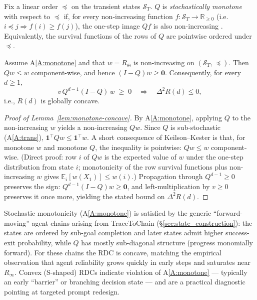 \begin{assumption}\label{A:monotone}
Fix a linear order $\preceq$ on the transient states $\mathcal{S}_T$.
$Q$ is \emph{stochastically monotone} with respect to $\preceq$ if, for
every non-increasing function $f:\mathcal{S}_T\to\mathbb{R}_{\ge 0}$
(i.e.\ $i\preceq j\Rightarrow f(i)\ge f(j)$), the one-step image
$Qf$ is also non-increasing
\cite{keilsonKester1977,daley1968stochastic}. Equivalently, the
survival functions of the rows of $Q$ are pointwise ordered under
$\preceq$.
\end{assumption}

\iffalse
\begin{lemma}
\label{lem:monotone-concave}
Assume A\ref{A:monotone} and that $w=R_\oplus$ is non-increasing on
$(\mathcal{S}_T,\preceq)$. Then $Qw\le w$ component-wise, and hence
$(I-Q)w\ge\mathbf{0}$.  Consequently, for every $d\ge 1$,
\[
v\,Q^{d-1}(I-Q)\,w \;\ge\; 0 \quad\Longrightarrow\quad \Delta^{2}R(d)\le 0,
\]
i.e., $R(d)$ is globally concave.
\end{lemma}

\begin{proof}[Proof of Lemma~\ref{lem:monotone-concave}]
By A\ref{A:monotone}, applying $Q$ to the non-increasing $w$ yields a
non-increasing $Qw$. Since $Q$ is sub-stochastic (A\ref{A:trans}),
$\mathbf{1}^{\top}Qw\le\mathbf{1}^{\top}w$. A short consequence of
Keilson--Kester \cite[Thm.~3.2]{keilsonKester1977} is that, for
monotone $w$ and monotone $Q$, the inequality is pointwise:
$Qw\le w$ component-wise. (Direct proof: row $i$ of $Qw$ is the
expected value of $w$ under the one-step distribution from state $i$;
monotonicity of the row survival functions plus non-increasing $w$
gives $\mathbb{E}_{i}[w(X_{1})]\le w(i)$.) Propagation through
$Q^{d-1}\ge 0$ preserves the sign:
$Q^{d-1}(I-Q)w\ge\mathbf{0}$, and left-multiplication by $v\ge 0$
preserves it once more, yielding the stated bound on
$\Delta^{2}R(d)$.
\end{proof}

\begin{remark}
Stochastic monotonicity (A\ref{A:monotone}) is satisfied by the
generic ``forward-moving'' agent chains arising from TraceToChain
(\S\ref{sec:state_construction}): the states are ordered by
sub-goal completion and later states admit higher success-exit
probability, while $Q$ has mostly sub-diagonal structure (progress
monomially forward). For these chains the RDC is concave, matching
the empirical observation that agent reliability grows quickly in
early steps and saturates near $R_\infty$. Convex (S-shaped) RDCs
indicate violation of A\ref{A:monotone} --- typically an early
``barrier'' or branching decision state --- and are a practical
diagnostic pointing at targeted prompt redesign.
\end{remark}


